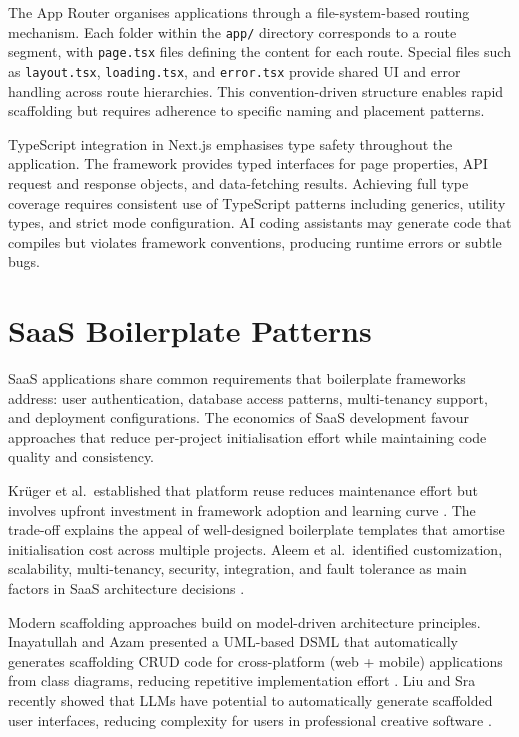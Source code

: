 \documentclass[12pt,a4paper]{report}
\DeclareRobustCommand{\filename}[1]{\bgroup\urlstyle{tt}\nolinkurl{#1}\egroup}
\begin{document}
The App Router organises applications through a file-system-based routing mechanism. Each folder within the \filename{app/} directory corresponds to a route segment, with \filename{page.tsx} files defining the content for each route. Special files such as \filename{layout.tsx}, \filename{loading.tsx}, and \filename{error.tsx} provide shared UI and error handling across route hierarchies. This convention-driven structure enables rapid scaffolding but requires adherence to specific naming and placement patterns.

TypeScript integration in Next.js emphasises type safety throughout the application. The framework provides typed interfaces for page properties, API request and response objects, and data-fetching results. Achieving full type coverage requires consistent use of TypeScript patterns including generics, utility types, and strict mode configuration. AI coding assistants may generate code that compiles but violates framework conventions, producing runtime errors or subtle bugs.

\section{SaaS Boilerplate Patterns}

SaaS applications share common requirements that boilerplate frameworks address: user authentication, database access patterns, multi-tenancy support, and deployment configurations. The economics of SaaS development favour approaches that reduce per-project initialisation effort while maintaining code quality and consistency.

Krüger et al.\ established that platform reuse reduces maintenance effort but involves upfront investment in framework adoption and learning curve \parencite{kruger2020empirical}. The trade-off explains the appeal of well-designed boilerplate templates that amortise initialisation cost across multiple projects. Aleem et al.\ identified customization, scalability, multi-tenancy, security, integration, and fault tolerance as main factors in SaaS architecture decisions \parencite{aleem2019maturity}.

Modern scaffolding approaches build on model-driven architecture principles. Inayatullah and Azam presented a UML-based DSML that automatically generates scaffolding CRUD code for cross-platform (web + mobile) applications from class diagrams, reducing repetitive implementation effort \parencite{inayatullah2019model}. Liu and Sra recently showed that LLMs have potential to automatically generate scaffolded user interfaces, reducing complexity for users in professional creative software \parencite{liu2025auggen}.
\end{document}
